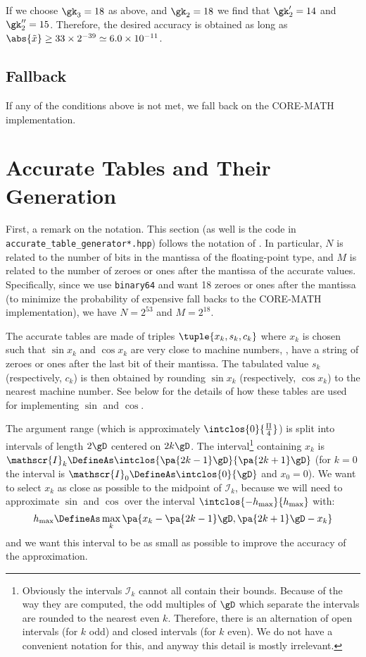 \documentclass[10pt, a4paper, twoside]{basestyle}
\newcommand{\red}[1]{\tilde{#1}}
\begin{document}
If we choose $\gk_3 = 18$ as above, and $\gk_2 = 18$ we find that $\gk'_2 = 14$ and $\gk''_2 = 15$.  Therefore, the desired accuracy is obtained as long as $\abs{\red x} \geq 33 \times 2^{-39} \simeq 6.0 \times 10^{-11}$.

\subsection*{Fallback}

If any of the conditions above is not met, we fall back on the CORE-MATH implementation.

\section*{Accurate Tables and Their Generation}

First, a remark on the notation.  This section (as well is the code in \linebreak\texttt{accurate\_table\_generator*.hpp}) follows the notation of \cite{StehléZimmermann2005}.  In particular, $N$ is related to the number of bits in the mantissa of the floating-point type, and $M$ is related to the number of zeroes or ones after the mantissa of the accurate values.  Specifically, since we use \texttt{binary64} and want 18 zeroes or ones after the mantissa (to minimize the probability of expensive fall backs to the CORE-MATH implementation), we have $N = 2^{53}$ and $M = 2^{18}$. 

The accurate tables are made of triples $\tuple{x_k, s_k, c_k}$ where $x_k$ is chosen such that $\sin x_k$ and $\cos x_k$ are very close to machine numbers, \idest, have a string of zeroes or ones after the last bit of their mantissa.  The tabulated value $s_k$ (respectively, $c_k$) is then obtained by rounding $\sin x_k$ (respectively, $\cos x_k$) to the nearest machine number.  See  below for the details of how these tables are used for implementing $\sin$ and $\cos$.

The argument range (which is approximately $\intclos{0}{\frac{\Pi}{4}}$) is split into intervals of length $2 \gD$ centered on $2 k \gD$.  The interval\footnote{Obviously the intervals $\mathscr{I}_k$ cannot all contain their bounds.  Because of the way they are computed, the odd multiples of $\gD$ which separate the intervals are rounded to the nearest even $k$.  Therefore, there is an alternation of open intervals (for $k$ odd) and closed intervals (for $k$ even).  We do not have a convenient notation for this, and anyway this detail is mostly irrelevant.} containing $x_k$ is $\mathscr{I}_k \DefineAs \intclos{\pa{2 k - 1}\gD}{\pa{2 k + 1}\gD}$ (for $k = 0$ the interval is $\mathscr{I}_0 \DefineAs \intclos{0}{\gD}$ and $x_0 = 0$).  We want to select $x_k$ as close as possible to the midpoint of $\mathscr{I}_k$, because we will need to approximate $\sin$ and $\cos$ over the interval $\intclos{-h_{\text{max}}}{h_{\text{max}}}$ with:
\[
h_{\text{max}} \DefineAs \max_k \pa{x_k - \pa{2 k - 1} \gD, \pa{2 k + 1} \gD - x_k}
\]
and we want this interval to be as small as possible to improve the accuracy of the approximation.
\end{document}
